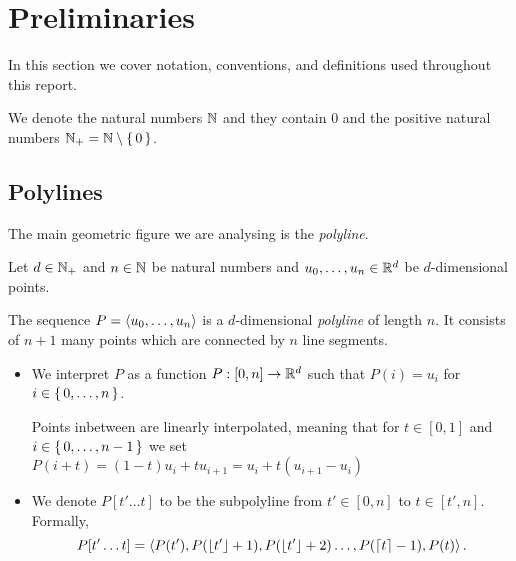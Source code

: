 \section{Preliminaries}
\label{sec:preliminaries}

In this section we cover notation, conventions, and definitions used throughout this report.  

We denote the natural numbers \(\mathbb{N}\) and they contain \(0\) and the positive natural numbers \(\mathbb{N}_+ = \mathbb{N} \setminus\set{0}\).

\subsection{Polylines}
\label{ssec:polylines}
The main geometric figure we are analysing is the \emph{polyline}.
\begin{definition}[Polyline]
  Let \(d\in \mathbb{N}_+\) and \(n \in \mathbb{N}\) be natural numbers and \(u_0, \dots, u_n \in \mathbb{R}^d\) be \(d\)-dimensional points. 

  The sequence \(P = \left\langle u_0, \dots, u_n\right\rangle\) is a \(d\)-dimensional \emph{polyline} of length \(n\). It consists of \(n+1\) many points which are connected by \(n\) line segments. 

  \begin{itemize}
    \item We interpret \(P\) as a function \(P:[0,n] \to \mathbb{R}^d\) such that \(P(i) = u_i\) for \(i \in \set{0, \dots, n}\).

      Points inbetween are linearly interpolated, meaning that for \(t \in [0, 1]\) and \(i \in \set{0, \dots, n - 1}\) we set \(P(i + t) = (1- t)u_i + t u_{i+1} = u_i + t(u_{i+1} - u_i)\)
    \item We denote \(P[t'\dots t]\) to be the subpolyline from \(t' \in [0, n]\) to \(t \in [t', n]\). Formally, \[P[t'\dots t] = \left\langle P(t'), P(\left\lfloor t'\right\rfloor + 1),  P(\left\lfloor t'\right\rfloor + 2) \dots, P(\left\lceil t\right\rceil - 1), P(t)\right\rangle.\]
  \end{itemize}

\end{definition}

